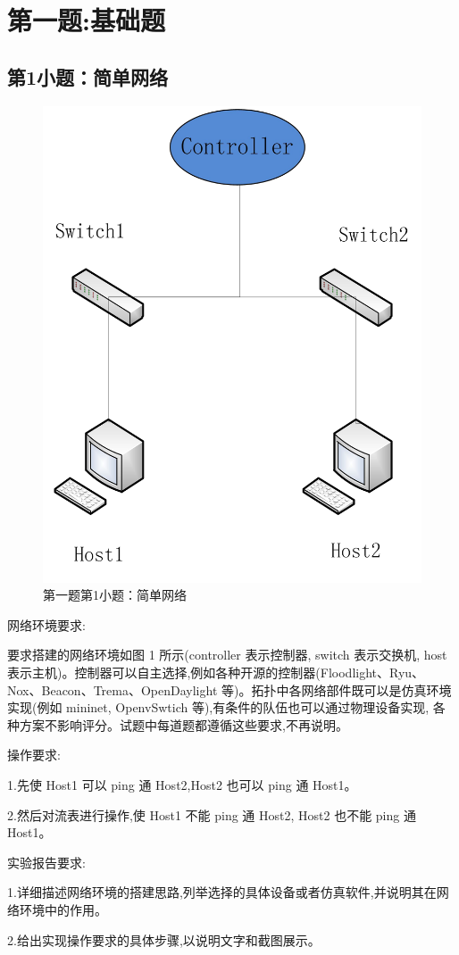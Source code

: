 \documentclass[format=draft,language=chinese,category=SDN]{hustreport}
\begin{document}
\section{第一题:基础题}\label{sec:Q1}
\subsection{第1小题：简单网络}\label{sec:Q1_1}

\begin{figure}[!h]
\centering
\includegraphics[width=.618\textwidth]{fig/1_1-0.png}
\caption{第一题第1小题：简单网络}\label{fig:Q1_1-0}
\end{figure}

网络环境要求:

要求搭建的网络环境如图 1 所示(controller 表示控制器, switch 表示交换机, host表示主机)。控制器可以自主选择,例如各种开源的控制器(Floodlight、Ryu、
Nox、Beacon、Trema、OpenDaylight 等)。拓扑中各网络部件既可以是仿真环境实现(例如 mininet, OpenvSwtich 等),有条件的队伍也可以通过物理设备实现,
各种方案不影响评分。试题中每道题都遵循这些要求,不再说明。

操作要求:

1.先使 Host1 可以 ping 通 Host2,Host2 也可以 ping 通 Host1。

2.然后对流表进行操作,使 Host1 不能 ping 通 Host2, Host2 也不能 ping 通 Host1。

实验报告要求:

1.详细描述网络环境的搭建思路,列举选择的具体设备或者仿真软件,并说明其在网络环境中的作用。

2.给出实现操作要求的具体步骤,以说明文字和截图展示。
\end{document}
